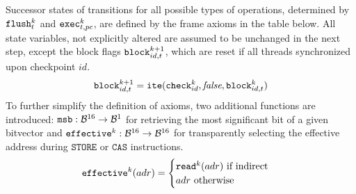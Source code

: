 \noindent
Successor states of transitions for all possible types of operations, determined by $\FLUSH^k_t$ and $\EXEC^k_{t, pc}$, are defined by the frame axioms in the table below.
All state variables, not explicitly altered are assumed to be unchanged in the next step, except the block flags $\BLOCK^{k + 1}_{id, t}$, which are reset if all threads synchronized upon checkpoint $id$.
\[
  \BLOCK^{k + 1}_{id, t} = \ITE(\CHECK^k_{id}, \FALSE, \BLOCK^k_{id, t})
\]
To further simplify the definition of axioms, two additional functions are introduced:
$\MSB: \BVSORT \to \BVSORT[1]$ for retrieving the most significant bit of a given bitvector and $\EFFECTIVE^k: \BVSORT \to \BVSORT$ for transparently selecting the effective address during $\texttt{STORE}$ or $\texttt{CAS}$ instructions.
\[
  \EFFECTIVE^k(adr) =
  \begin{cases}
    \READ^k(adr) \text{ if indirect} \\
    adr \text{ otherwise}
  \end{cases}
\]




